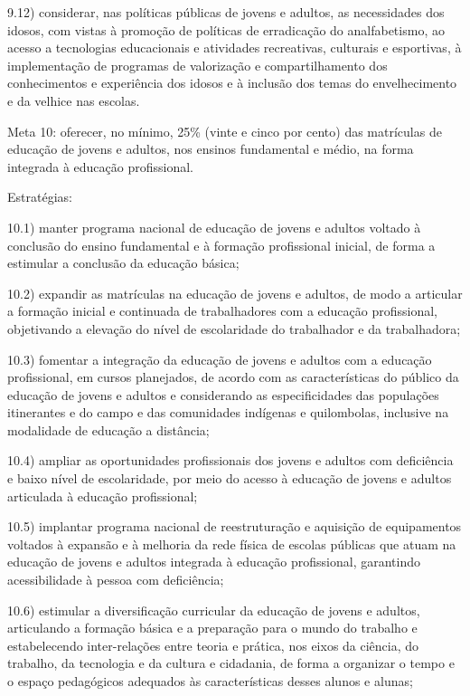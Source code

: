 \documentclass[
]{book}
\begin{document}
9.12) considerar, nas políticas públicas de jovens e adultos, as necessidades dos idosos, com vistas à promoção de políticas de erradicação do analfabetismo, ao acesso a tecnologias educacionais e atividades recreativas, culturais e esportivas, à implementação de programas de valorização e compartilhamento dos conhecimentos e experiência dos idosos e à inclusão dos temas do envelhecimento e da velhice nas escolas.

Meta 10: oferecer, no mínimo, 25\% (vinte e cinco por cento) das matrículas de educação de jovens e adultos, nos ensinos fundamental e médio, na forma integrada à educação profissional.

Estratégias:

10.1) manter programa nacional de educação de jovens e adultos voltado à conclusão do ensino fundamental e à formação profissional inicial, de forma a estimular a conclusão da educação básica;

10.2) expandir as matrículas na educação de jovens e adultos, de modo a articular a formação inicial e continuada de trabalhadores com a educação profissional, objetivando a elevação do nível de escolaridade do trabalhador e da trabalhadora;

10.3) fomentar a integração da educação de jovens e adultos com a educação profissional, em cursos planejados, de acordo com as características do público da educação de jovens e adultos e considerando as especificidades das populações itinerantes e do campo e das comunidades indígenas e quilombolas, inclusive na modalidade de educação a distância;

10.4) ampliar as oportunidades profissionais dos jovens e adultos com deficiência e baixo nível de escolaridade, por meio do acesso à educação de jovens e adultos articulada à educação profissional;

10.5) implantar programa nacional de reestruturação e aquisição de equipamentos voltados à expansão e à melhoria da rede física de escolas públicas que atuam na educação de jovens e adultos integrada à educação profissional, garantindo acessibilidade à pessoa com deficiência;

10.6) estimular a diversificação curricular da educação de jovens e adultos, articulando a formação básica e a preparação para o mundo do trabalho e estabelecendo inter-relações entre teoria e prática, nos eixos da ciência, do trabalho, da tecnologia e da cultura e cidadania, de forma a organizar o tempo e o espaço pedagógicos adequados às características desses alunos e alunas;
\end{document}
